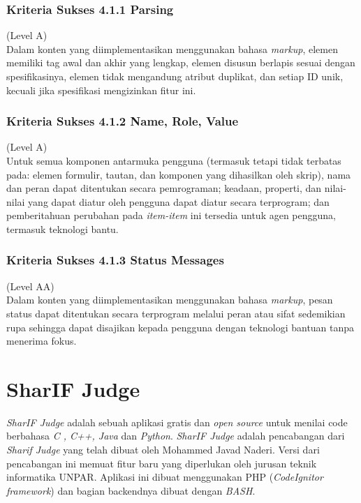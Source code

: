 \subsubsection{Kriteria Sukses 4.1.1 Parsing}
\label{sec:kriteria_4.1.1}
(Level A) \\

Dalam konten yang diimplementasikan menggunakan bahasa \textit{markup}, elemen memiliki tag awal dan akhir yang lengkap, elemen disusun berlapis sesuai dengan spesifikasinya, elemen tidak mengandung atribut duplikat, dan setiap ID unik, kecuali jika spesifikasi mengizinkan fitur ini.

\subsubsection{Kriteria Sukses 4.1.2 Name, Role, Value}
\label{sec:kriteria_4.1.2}
(Level A) \\

Untuk semua komponen antarmuka pengguna (termasuk tetapi tidak terbatas pada: elemen formulir, tautan, dan komponen yang dihasilkan oleh skrip), nama dan peran dapat ditentukan secara pemrograman; keadaan, properti, dan nilai-nilai yang dapat diatur oleh pengguna dapat diatur secara terprogram; dan pemberitahuan perubahan pada \textit{item-item} ini tersedia untuk agen pengguna, termasuk teknologi bantu.

\subsubsection{Kriteria Sukses 4.1.3 Status Messages}
\label{sec:kriteria_4.1.3}
(Level AA) \\

Dalam konten yang diimplementasikan menggunakan bahasa \textit{markup}, pesan status dapat ditentukan secara terprogram melalui peran atau sifat sedemikian rupa sehingga dapat disajikan kepada pengguna dengan teknologi bantuan tanpa menerima fokus.

\section{SharIF Judge}
\label{sec:SharIF_Judge}
\textit{SharIF Judge} adalah sebuah aplikasi gratis dan \textit{open source} untuk menilai code berbahasa \textit{C , C++, Java} dan \textit{Python}. \textit{SharIF Judge} adalah pencabangan dari \textit{Sharif Judge} yang telah dibuat oleh Mohammed Javad Naderi. Versi dari pencabangan ini memuat fitur baru yang diperlukan oleh jurusan teknik informatika UNPAR. Aplikasi ini dibuat menggunakan PHP (\textit{CodeIgnitor framework}) dan bagian backendnya dibuat dengan \textit{BASH}.

